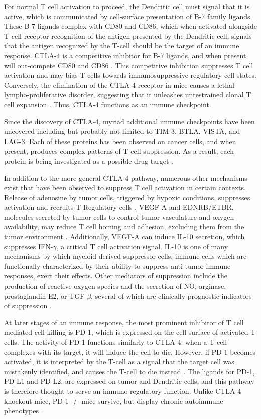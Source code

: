 For normal T cell activation to proceed, the Dendritic cell must signal that it is active, which is communicated by cell-surface presentation of B-7 family ligands. 
These B-7 ligands complex with CD80 and CD86, which when activated alongside T cell receptor recognition of the antigen presented by the Dendritic cell, signals that the antigen recognized by the T-cell should be the target of an immune response. 
CTLA-4 is a competitive inhibitor for B-7 ligands, and when present will out-compete CD80 and CD86 \citep{Qureshi2011}. 
This competitive inhibition suppresses T cell activation \citep{Wing2008} and may bias T cells towards immunosuppressive regulatory cell states. 
Conversely, the elimination of the CTLA-4 receptor in mice causes a lethal lympho-proliferative disorder, suggesting that it unleashes unrestrained clonal T cell expansion \citep{Tivol1995}.
Thus, CTLA-4 functions as an immune checkpoint.

Since the discovery of CTLA-4, myriad additional immune checkpoints have been uncovered including but probably not limited to TIM-3, BTLA, VISTA, and LAG-3.
Each of these proteins has been observed on cancer cells, and when present, produces complex patterns of T cell suppression. 
As a result, each protein is being investigated as a possible drug target \citep{Sharma2017}.

In addition to the more general CTLA-4 pathway, numerous other mechanisms exist that have been observed to suppress T cell activation in certain contexts. 
Release of adenosine by tumor cells, triggered by hypoxic conditions, suppresses activation and recruits T Regulatory cells \citep{Ohta2006}. 
VEGF-A and EDNRB/ETBR, molecules secreted by tumor cells to control tumor vasculature and oxygen availability, may reduce T cell homing and adhesion, excluding them from the tumor environment \citep{Bouzin2007}. 
Additionally, VEGF-A can induce IL-10 secretion, which suppresses IFN-$\gamma$, a critical T cell activation signal. 
IL-10 is one of many mechanisms by which myeloid derived suppressor cells, immune cells which are functionally characterized by their ability to suppress anti-tumor immune responses, exert their effects. 
Other mediators of suppression include the production of reactive oxygen species and the secretion of NO, arginase, prostaglandin E2, or TGF-$\beta$, several of which are clinically prognostic indicators of suppression \citep{Muller2006}.

At later stages of an immune response, the most prominent inhibitor of T cell mediated cell-killing is PD-1, which is expressed on the cell surface of activated T cells.
The activity of PD-1 functions similarly to CTLA-4: when a T-cell complexes with its target, it will induce the cell to die. 
However, if PD-1 becomes activated, it is interpreted by the T-cell as a signal that the target cell was mistakenly identified, and causes the T-cell to die instead \citep{Keir2008}. 
The ligands for PD-1, PD-L1 and PD-L2, are expressed on tumor and Dendritic cells, and this pathway is therefore thought to serve an immuno-regulatory function. 
Unlike CTLA-4 knockout mice, PD-1 -/- mice survive, but display chronic autoimmune phenotypes \citep{Nishimura1999,Nishimura2001}.

